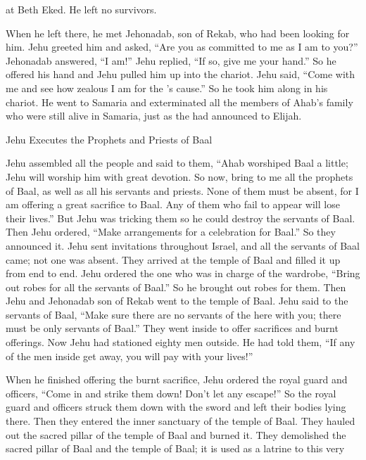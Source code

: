 {at Beth Eked.
He left
no
survivors.
\par }{\PP {}When he left
there,
he
met
Jehonadab,
son
of Rekab,
who had
been looking for him. Jehu greeted him
and asked, “Are you
as
committed
to me
as
I am to you?” Jehonadab
answered, “I
am!” Jehu replied,
“If
so,
give
me your hand.”
So he
offered
his hand
and Jehu pulled him
up into
the chariot.
Jehu said,
“Come
with
me and see
how zealous
I am for the
{}’s
cause.”
So he took him along in his chariot.
He went
to Samaria
and exterminated
all
the members of Ahab’s
family who were still alive in Samaria,
just
as the
{}
had
announced
to
Elijah.
\par }{\SH Jehu Executes the Prophets and Priests of Baal
\par }{\PP {}Jehu
assembled
all
the people
and said
to
them, “Ahab
worshiped
Baal
a little;
Jehu
will worship
him with great devotion.
So now,
bring
to me all
the prophets
of Baal,
as well as all
his servants
and priests.
None
of them must be absent,
for
I am offering a great
sacrifice
to Baal.
Any
of them who fail to appear
will lose their lives.”
But Jehu
was tricking
them so
he could destroy
the
servants
of Baal.
Then Jehu
ordered, “Make arrangements
for a celebration
for Baal.”
So
they announced it.
Jehu
sent
invitations
throughout
Israel,
and all
the servants
of Baal
came;
not
one
was absent.
They arrived
at the temple
of Baal
and filled it up from end to end.
Jehu ordered
the one who was in charge
of the wardrobe, “Bring out
robes
for all
the servants of Baal.”
So he brought out
robes for them.
Then Jehu
and Jehonadab
son
of Rekab
went
to the temple
of Baal.
Jehu said
to the servants
of Baal,
“Make sure
there
are no servants
of the {}
here
with you; there must be only
servants
of Baal.”
They went
inside to offer
sacrifices
and burnt offerings.
Now Jehu
had stationed
eighty
men
outside.
He
had told
them, “If any of the men
inside
get away,
you will pay with
your lives!”
\par }{\PP {}When
he finished
offering the burnt sacrifice,
Jehu
ordered
the royal guard
and officers,
“Come
in and strike
them down! Don’t
let any escape!” So the royal guard
and officers
struck
them down with the sword
and left their bodies lying
there. Then
they
entered
the inner sanctuary of the temple
of Baal.
They hauled out
the sacred pillar
of the temple
of Baal
and burned it.
They demolished
the sacred pillar
of Baal
and the temple
of Baal;
it is used as
a latrine
to
this very
}
